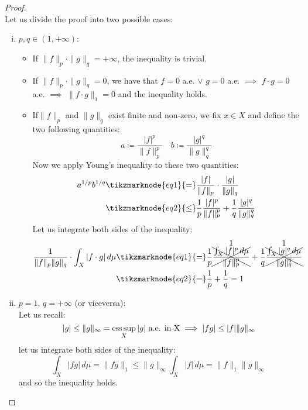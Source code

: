 \begin{proof}
    \hspace*{\fill}\\ %
    Let us divide the proof into two possible cases:
    \begin{enumerate}[i)]
        \item $p,q \in (1,+\infty)$:
            \begin{itemize}
                \item If $\|f\|_p\cdot\|g\|_q=+\infty$, the inequality is trivial.
                \item If $\|f\|_p\cdot\|g\|_q=0$, we have that $f=0$ a.e. $\vee$ $g=0$ a.e. $\implies$ $f\cdot g=0$ a.e. $\implies$ $\|f\cdot g\|_1=0$ and the inequality holds.
                \item If$\|f\|_p$ and $\|g\|_q$ exist finite and non-zero, we fix $x\in X$ and define the two following quantities:
                    \[ a \coloneqq \frac{|f|^p}{\|f\|^p_p} \quad b \coloneqq \frac{|g|^q}{\|g\|^q_q} \]
                    Now we apply Young's inequality to these two quantities:
                    \begin{align*}
                        a^{1/p} b ^{1/q} & \tikzmarknode{eq1}{=} \frac{|f|}{\|f\|_p} \cdot \frac{|g|}{\|g\|_q} \\
                        & \tikzmarknode{eq2}{\leq} \frac{1}{p}\frac{|f|^p}{\|f\|^p_p} + \frac{1}{q}\frac{|g|^q}{\|g\|^q_q}
                    \end{align*}
                    Let us integrate both sides of the inequality:
                    \begin{align*}
                        \frac{1}{\|f\|_p\|g\|_q} \cdot \int_X |f \cdot g| \, d\mu & \tikzmarknode{eq1}{=} \frac{1}{p}\cancelnum{1}{\frac{\int_X |f|^p \, d\mu}{\|f\|^p_p}} + \frac{1}{q}\cancelnum{1}{\frac{\int_X |g|^q \, d\mu}{\|g\|^q_q}} \\
                        & \tikzmarknode{eq2}{=} \frac{1}{p} + \frac{1}{q} = 1
                    \end{align*}
            \end{itemize}
        \item $p=1$, $q=+\infty$ (or viceversa): \\
            Let us recall:
            \[ |g| \leq \|g\|_\infty = \operatorname*{ess\,sup}_X |g| \text{ a.e. in X} \implies |fg| \leq |f| \|g\|_\infty \]
            let us integrate both sides of the inequality:
            \[ \int_X |fg| \, d\mu = \|fg\|_1 \leq \|g\|_\infty \int_X |f| \, d\mu = \|f\|_1 \|g\|_\infty \]
            and so the inequality holds.
    \end{enumerate}

\end{proof}

